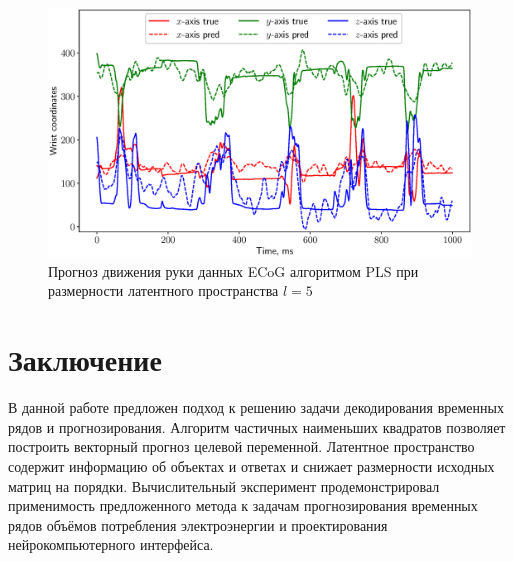 \documentclass[12pt,twoside]{article}
\begin{document}
\begin{figure}[!h]
	\centering
	\includegraphics[width=\textwidth]{figs/ecog_prediction}
	\caption{Прогноз движения руки данных ECoG алгоритмом PLS при размерности латентного пространства $l=5$}
	\label{fig::ecog_prediction}
\end{figure}

\section{Заключение}
В данной работе предложен подход к решению задачи декодирования временных рядов и прогнозирования. 
Алгоритм частичных наименьших квадратов позволяет построить векторный прогноз целевой переменной. 
Латентное пространство содержит информацию об объектах и ответах и снижает размерности исходных матриц на порядки. 
Вычислительный эксперимент продемонстрировал применимость предложенного метода к задачам прогнозирования временных рядов объёмов потребления электроэнергии и проектирования нейрокомпьютерного интерфейса.




\end{document}
